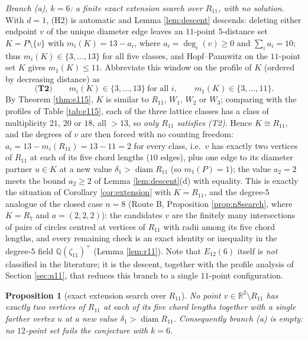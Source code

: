 \documentclass[11pt]{article}
\newtheorem{proposition}[theorem]{Proposition}
\theoremstyle{definition}
\theoremstyle{remark}
\newcommand{\R}{\mathbb{R}}
\newcommand{\Q}{\mathbb{Q}}
\DeclareMathOperator{\diam}{diam}
\begin{document}
\emph{Branch (a), $k = 6$: a finite exact extension search over $R_{11}$, with no
solution.} With $d = 1$, (H2) is automatic and Lemma \ref{lem:descent} descends: deleting either endpoint
$v$ of the unique diameter edge leaves an $11$-point $5$-distance set $K = P \setminus
\{v\}$ with $m_i(K) = 13 - a_i$, where $a_i = \deg_i(v) \ge 0$ and $\sum_i a_i = 10$; thus
$m_i(K) \in \{3, \dots, 13\}$ for all five classes, and Hopf--Pannwitz on the $11$-point
set $K$ gives $m_1(K) \le 11$. Abbreviate this window on the profile of $K$ (ordered by
decreasing distance) as
\[
\textbf{(T2)}\qquad m_i(K) \in \{3, \dots, 13\} \ \text{for all } i, \qquad m_1(K) \in
\{3, \dots, 11\}.
\]
By Theorem \ref{thm:e115}, $K$ is similar to $R_{11}$, $W_1$, $W_2$ or $W_3$; comparing
with the profiles of Table \ref{tab:e115}, each of the three lattice classes has a class
of multiplicity $21$, $20$ or $18$, all $> 13$, so \emph{only $R_{11}$ satisfies (T2)}.
Hence $K \cong R_{11}$, and the degrees of $v$ are then forced with no counting freedom:
$a_i = 13 - m_i(R_{11}) = 13 - 11 = 2$ for every class, i.e.\ $v$ has exactly two vertices
of $R_{11}$ at each of its five chord lengths ($10$ edges), plus one edge to its diameter
partner $u \in K$ at a new value $\delta_1 > \diam R_{11}$ (so $m_1(P) = 1$); the value
$a_2 = 2$ meets the bound $a_2 \ge 2$ of Lemma \ref{lem:descent}(d) with equality. This is
exactly the situation of Corollary \ref{cor:extension} with $K = R_{11}$, and the
degree-$5$ analogue of the closed case $n = 8$ (Route B, Proposition \ref{prop:n8search},
where $K = R_7$ and $a = (2,2,2)$): the candidates $v$ are the finitely many intersections
of pairs of circles centred at vertices of $R_{11}$ with radii among its five chord
lengths, and every remaining check is an exact identity or inequality in the degree-$5$
field $\Q(\zeta_{11})^+$ (Lemma \ref{lem:r11}). Note that $E_{12}(6)$ itself is \emph{not}
classified in the literature; it is the descent, together with the profile analysis of
Section \ref{sec:n11}, that reduces this branch to a single $11$-point configuration.

\begin{proposition}[exact extension search over $R_{11}$]\label{prop:n12search}
No point $v \in \R^2 \setminus R_{11}$ has exactly two vertices of $R_{11}$ at each of its
five chord lengths together with a single farther vertex $u$ at a new value
$\delta_1 > \diam R_{11}$. Consequently branch \emph{(a)} is empty: no $12$-point set
fails the conjecture with $k = 6$.
\end{proposition}
\end{document}

